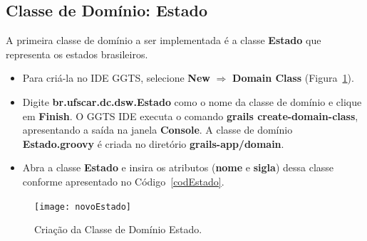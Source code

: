 \subsection{Classe de Domínio: Estado}\label{secEstado}

\vspace{0.5cm}

A primeira  classe de  domínio a ser  implementada é  a classe {\bf  Estado} que
representa os estados brasileiros.

\begin{itemize}

\item  Para criá-la  no IDE  GGTS,  selecione {\bf  New} $\Longrightarrow$  {\bf
  Domain Class} (Figura~\ref{novoEstadoFig}).

\vspace{0.5cm}

\item Digite  {\bf br.ufscar.dc.dsw.Estado} como o  nome da classe  de domínio e
  clique  em  {\bf   Finish}.   O  GGTS  IDE  executa   o  comando  {\bf  grails
    create-domain-class}, apresentando a saída na janela {\bf Console}. A classe
  de    domínio   {\bf    Estado.groovy}    é   criada    no   diretório    {\bf
    grails-app/domain}.  

\vspace{0.5cm}

\item  Abra a  classe {\bf  Estado} e  insira os  atributos ({\bf  nome}  e {\bf
  sigla}) dessa classe conforme apresentado no Código~\ref{codEstado}. 

\end{itemize}

\begin{figure}[htbp]
\centering\texttt{[image: novoEstado]}
\caption{Criação da Classe de Domínio Estado.}
\label{novoEstadoFig}
\end{figure}

\hspace{1cm}\\


